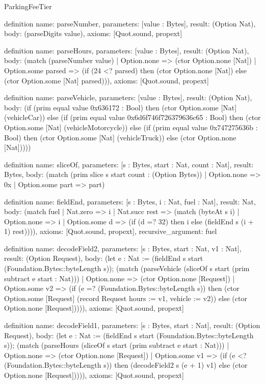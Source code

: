 \begin{lexlean}{ParkingFeeTier}
\begin{semanticmodule}
definition{
  name: parseNumber,
  parameters: [value : Bytes],
  result: (Option Nat),
  body: (parseDigits value),
  axioms: [Quot.sound, propext]
}

definition{
  name: parseHours,
  parameters: [value : Bytes],
  result: (Option Nat),
  body: (match (parseNumber value)
    | Option.none => (ctor Option.none [Nat])
    | Option.some parsed => (if (24 <? parsed) then (ctor Option.none [Nat]) else (ctor Option.some [Nat] parsed))),
  axioms: [Quot.sound, propext]
}

definition{
  name: parseVehicle,
  parameters: [value : Bytes],
  result: (Option Nat),
  body: (if (prim equal value 0x636172 : Bool) then (ctor Option.some [Nat] (vehicleCar)) else (if (prim equal value 0x6d6f746f726379636c65 : Bool) then (ctor Option.some [Nat] (vehicleMotorcycle)) else (if (prim equal value 0x747275636b : Bool) then (ctor Option.some [Nat] (vehicleTruck)) else (ctor Option.none [Nat]))))
}

definition{
  name: sliceOf,
  parameters: [s : Bytes, start : Nat, count : Nat],
  result: Bytes,
  body: (match (prim slice s start count : (Option Bytes))
    | Option.none => 0x
    | Option.some part => part)
}

definition{
  name: fieldEnd,
  parameters: [s : Bytes, i : Nat, fuel : Nat],
  result: Nat,
  body: (match fuel
    | Nat.zero => i
    | Nat.succ rest => (match (byteAt s i)
      | Option.none => i
      | Option.some d => (if (d =? 32) then i else (fieldEnd s (i + 1) rest)))),
  axioms: [Quot.sound, propext],
  recursive_argument: fuel
}

definition{
  name: decodeField2,
  parameters: [s : Bytes, start : Nat, v1 : Nat],
  result: (Option Request),
  body: (let e : Nat := (fieldEnd s start (Foundation.Bytes::byteLength s)); (match (parseVehicle (sliceOf s start (prim subtract e start : Nat)))
    | Option.none => (ctor Option.none [Request])
    | Option.some v2 => (if (e =? (Foundation.Bytes::byteLength s)) then (ctor Option.some [Request] (record Request {hours := v1, vehicle := v2})) else (ctor Option.none [Request])))),
  axioms: [Quot.sound, propext]
}

definition{
  name: decodeField1,
  parameters: [s : Bytes, start : Nat],
  result: (Option Request),
  body: (let e : Nat := (fieldEnd s start (Foundation.Bytes::byteLength s)); (match (parseHours (sliceOf s start (prim subtract e start : Nat)))
    | Option.none => (ctor Option.none [Request])
    | Option.some v1 => (if (e <? (Foundation.Bytes::byteLength s)) then (decodeField2 s (e + 1) v1) else (ctor Option.none [Request])))),
  axioms: [Quot.sound, propext]
}


\end{semanticmodule}
\end{lexlean}
